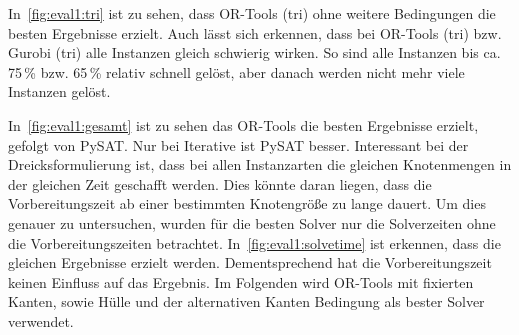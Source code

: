 In~\cref{fig:eval1:tri} ist zu sehen, dass OR-Tools (tri) ohne weitere Bedingungen die besten Ergebnisse erzielt.
Auch lässt sich erkennen, dass bei OR-Tools (tri) bzw. Gurobi (tri) alle Instanzen gleich schwierig wirken.
So sind alle Instanzen bis ca. 75\,\% bzw. 65\,\% relativ schnell gelöst, aber danach werden nicht mehr viele Instanzen gelöst.

In~\cref{fig:eval1:gesamt} ist zu sehen das OR-Tools die besten Ergebnisse erzielt, gefolgt von PySAT.
Nur bei Iterative ist PySAT besser.
Interessant bei der Dreicksformulierung ist, dass bei allen Instanzarten die gleichen Knotenmengen in der gleichen Zeit geschafft werden.
Dies könnte daran liegen, dass die Vorbereitungszeit ab einer bestimmten Knotengröße zu lange dauert.
Um dies genauer zu untersuchen, wurden für die besten Solver nur die Solverzeiten ohne die Vorbereitungszeiten betrachtet. 
In~\cref{fig:eval1:solvetime} ist erkennen, dass die gleichen Ergebnisse erzielt werden.
Dementsprechend hat die Vorbereitungszeit keinen Einfluss auf das Ergebnis.
Im Folgenden wird OR-Tools mit fixierten Kanten, sowie Hülle und der alternativen Kanten Bedingung als bester Solver verwendet.

